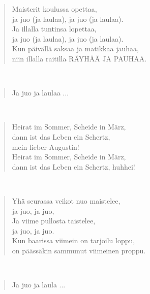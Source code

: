 \noindent\begin{minipage}{\linewidth}
\begin{verse}
	Maisterit koulussa opettaa,\\
	ja juo (ja laulaa), ja juo (ja laulaa).\\
	Ja illalla tuntinsa lopettaa,\\
	ja juo (ja laulaa), ja juo (ja laulaa).\\
	Kun päivällä saksaa ja matikkaa jauhaa,\\
	niin illalla raitilla RÄYHÄÄ JA PAUHAA.\\
\end{verse}
\end{minipage}\\[10pt]
\noindent\begin{minipage}{\linewidth}
\begin{verse}
	Ja juo ja laulaa ...\\
\end{verse}
\end{minipage}\\[10pt]
\noindent\begin{minipage}{\linewidth}
\begin{verse}
	Heirat im Sommer, Scheide in März,\\
	dann ist das Leben ein Schertz,\\
	mein lieber Augustin!\\
	Heirat im Sommer, Scheide in März,\\
	dann ist das Leben ein Schertz, huhhei!\\
\end{verse}
\end{minipage}\\[10pt]
\noindent\begin{minipage}{\linewidth}
\begin{verse}
	Yhä seurassa veikot nuo maistelee,\\
	ja juo, ja juo,\\
	Ja viime pullosta taistelee,\\
	ja juo, ja juo.\\
	Kun baarissa viimein on tarjoilu loppu,\\
	on päässäkin sammunut viimeinen proppu.\\
\end{verse}
\end{minipage}\\[10pt]
\noindent\begin{minipage}{\linewidth}
\begin{verse}
	Ja juo ja laula ...\\
\end{verse}
\end{minipage}\\[10pt]
